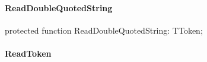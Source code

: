 \documentclass{report}
\newif\ifpdf
\begin{document}
\paragraph*{ReadDoubleQuotedString}\hspace*{\fill}

\label{PasDoc_Tokenizer.TTokenizer-ReadDoubleQuotedString}
\begin{list}{}{
\setlength{\itemindent}{0cm}
\setlength{\listparindent}{0cm}
\setlength{\leftmargin}{\evensidemargin}
\addtolength{\leftmargin}{\tmplength}
\settowidth{\labelsep}{X}
\addtolength{\leftmargin}{\labelsep}
\setlength{\labelwidth}{\tmplength}
}
\item[\textbf{Declaration}\hfill]
\ifpdf
\begin{flushleft}
\fi
\begin{ttfamily}
protected function ReadDoubleQuotedString: TToken;\end{ttfamily}

\ifpdf
\end{flushleft}
\fi

\end{list}
\paragraph*{ReadToken}\hspace*{\fill}
\end{document}
